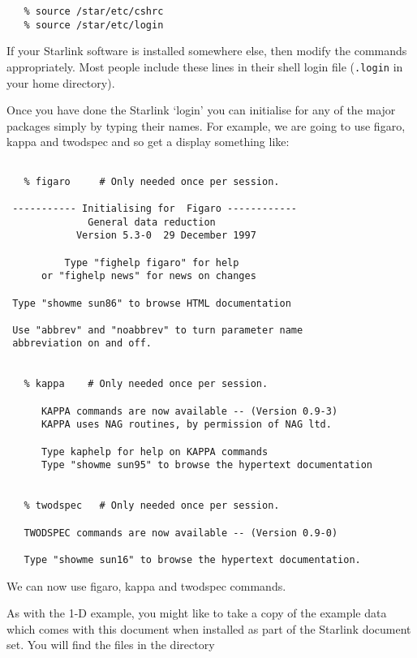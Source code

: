 \documentclass[twoside,11pt]{article}
\newcommand{\xref}[3]{#1}
\newcommand{\scspec}[2]{#1}
\newcommand{\scspec}[2]{#2}
\begin{document}
{
\scspec{\small}{ }
\begin{verbatim}
   % source /star/etc/cshrc
   % source /star/etc/login
\end{verbatim}
}

If your Starlink software is installed somewhere else,
then modify the commands appropriately.
Most people include these lines in their shell login file
(\verb+.login+ in your home directory).

Once you have done the Starlink `login' you can initialise for any of the
major packages simply by typing their names.
For example, we are going to use
\xref{{\sc figaro}}{sun86}{}\cite{figaro}, \xref{{\sc kappa}}{sun95}{}\cite{kappa} and
\xref{{\sc twodspec}}{sun16}{}\cite{twodspec} and so get a display
something like:

{
\scspec{\small}{ }
\begin{verbatim}

   % figaro     # Only needed once per session.

 ----------- Initialising for  Figaro ------------
              General data reduction
            Version 5.3-0  29 December 1997

          Type "fighelp figaro" for help
      or "fighelp news" for news on changes

 Type "showme sun86" to browse HTML documentation

 Use "abbrev" and "noabbrev" to turn parameter name
 abbreviation on and off.


   % kappa    # Only needed once per session.

      KAPPA commands are now available -- (Version 0.9-3)
      KAPPA uses NAG routines, by permission of NAG ltd.

      Type kaphelp for help on KAPPA commands
      Type "showme sun95" to browse the hypertext documentation


   % twodspec   # Only needed once per session.

   TWODSPEC commands are now available -- (Version 0.9-0)

   Type "showme sun16" to browse the hypertext documentation.
\end{verbatim}
}

We can now use {\sc figaro}, {\sc kappa} and {\sc twodspec} commands.

As with the 1-D example, you might like to take a copy of the example
data which comes with this document when installed as part of the
Starlink document set. You will find the files in the directory
\end{document}

